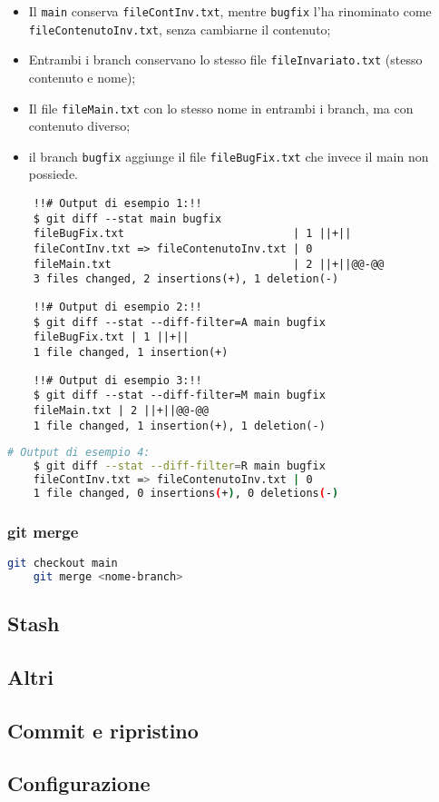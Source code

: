 \begin{itemize}[noitemsep, topsep=3pt]
	\item Il \texttt{main} conserva \texttt{fileContInv.txt}, mentre \texttt{bugfix} l'ha rinominato come  \texttt{fileContenutoInv.txt}, senza cambiarne il contenuto;
	\item Entrambi i branch conservano lo stesso file \texttt{fileInvariato.txt} (stesso contenuto e nome);
	\item Il file \texttt{fileMain.txt} con lo stesso nome in entrambi i branch, ma con contenuto diverso;
	\item il branch \texttt{bugfix} aggiunge il file \texttt{fileBugFix.txt} che invece il main non possiede.
\end{itemize}
\begin{lstlisting}
	!!# Output di esempio 1:!!
	$ git diff --stat main bugfix
	fileBugFix.txt                          | 1 ||+||
	fileContInv.txt => fileContenutoInv.txt | 0
	fileMain.txt                            | 2 ||+||@@-@@
	3 files changed, 2 insertions(+), 1 deletion(-)
\end{lstlisting}
\begin{lstlisting}
	!!# Output di esempio 2:!!
	$ git diff --stat --diff-filter=A main bugfix
	fileBugFix.txt | 1 ||+||
	1 file changed, 1 insertion(+)
\end{lstlisting}
\begin{lstlisting}
	!!# Output di esempio 3:!!
	$ git diff --stat --diff-filter=M main bugfix
	fileMain.txt | 2 ||+||@@-@@
	1 file changed, 1 insertion(+), 1 deletion(-)
\end{lstlisting}
\begin{lstlisting}[language=bash]
	# Output di esempio 4:
	$ git diff --stat --diff-filter=R main bugfix
	fileContInv.txt => fileContenutoInv.txt | 0
	1 file changed, 0 insertions(+), 0 deletions(-)
\end{lstlisting}

\subsubsection{git merge}
\begin{lstlisting}[language=bash]
	git checkout main
	git merge <nome-branch>
\end{lstlisting}



\subsection{Stash}



\subsection{Altri}


\subsection{Commit e ripristino}

\subsection{Configurazione}



